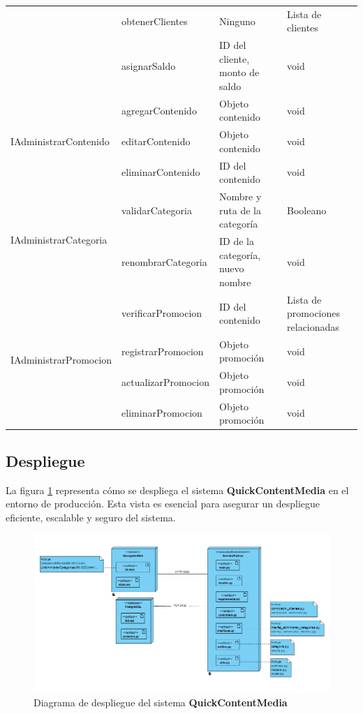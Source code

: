 \begin{longtable}{|p{5cm}|p{4cm}|p{3.5cm}|p{3.5cm}|}
    & obtenerClientes & Ninguno & Lista de clientes \\ \cline{2-4}
    & asignarSaldo & ID del cliente, monto de saldo & void \\ \hline
\multirow{3}{5cm}{IAdministrarContenido} 
    & agregarContenido & Objeto contenido & void \\ \cline{2-4}
    & editarContenido & Objeto contenido & void \\ \cline{2-4}
    & eliminarContenido & ID del contenido & void \\ \hline
\multirow{2}{5cm}{IAdministrarCategoria} 
    & validarCategoria & Nombre y ruta de la categoría & Booleano \\ \cline{2-4}
    & renombrarCategoria & ID de la categoría, nuevo nombre & void \\ \hline
\multirow{4}{5cm}{IAdministrarPromocion} 
    & verificarPromocion & ID del contenido & Lista de promociones relacionadas \\ \cline{2-4}
    & registrarPromocion & Objeto promoción & void \\ \cline{2-4}
    & actualizarPromocion & Objeto promoción & void \\ \cline{2-4}
    & eliminarPromocion & Objeto promoción & void \\ \hline

\end{longtable}

\newpage
\subsection{Despliegue}

La figura \ref{DiagDesp} representa cómo se despliega el sistema \textbf{QuickContentMedia} en el entorno de producción. Esta vista es esencial para asegurar un despliegue eficiente, escalable y seguro del sistema.

\begin{figure}[H]
    \centering
    \includegraphics[width=0.95\linewidth]{Media/4_Disenio/despliegue.png}
    \caption{Diagrama de despliegue del sistema \textbf{QuickContentMedia}}
    \label{DiagDesp}
\end{figure}

